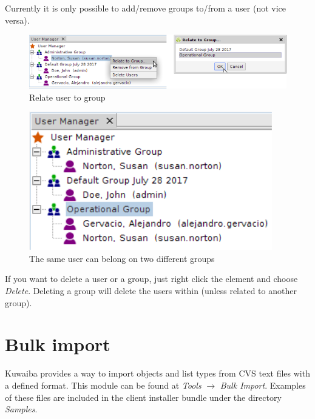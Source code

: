 \documentclass[a4paper]{article}
\begin{document}
		Currently it is only possible to add/remove groups to/from a user (not vice versa).\\
		\begin{figure}[h!]
			\centering
			\includegraphics[width=0.5\linewidth]{img/user_manager_relate_to_group.png}
			\caption{Relate user to group}
			\label{fig:user_manager_relate_to_group}
		\end{figure}
		
		\begin{figure}[h!]
			\centering
			\includegraphics[width=0.4\linewidth]{img/user_manager_user_and_groups.png}
			\caption{The same user can belong on two different groups}
			\label{fig:user_manager_user_and_groups}
		\end{figure}
		
		If you want to delete a user or a group, just right click the element and choose \textit{Delete}. Deleting a group will delete the users within (unless related to another group).
						
		\clearpage
		\section{Bulk import}\label{sec:bulk_import}
			Kuwaiba  provides a  way  to  import  objects  and  list  types  from CVS text files with a defined format.  This  module  can be  found at \textit{Tools} $\rightarrow$ \textit{Bulk Import}. Examples of these files are included in the client installer bundle under the directory \textit{Samples}.
\end{document}
